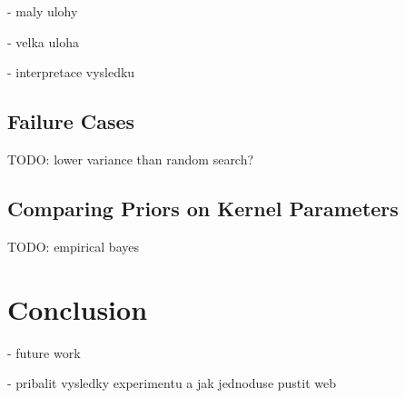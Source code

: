 - maly ulohy

- velka uloha

- interpretace vysledku
\\

\section{Failure Cases}


TODO: lower variance than random search?

\section{Comparing Priors on Kernel Parameters}
\label{section:experiments-empirical-bayes}

TODO: empirical bayes

\chapter{Conclusion}

- future work

- pribalit vysledky experimentu a jak jednoduse pustit web
